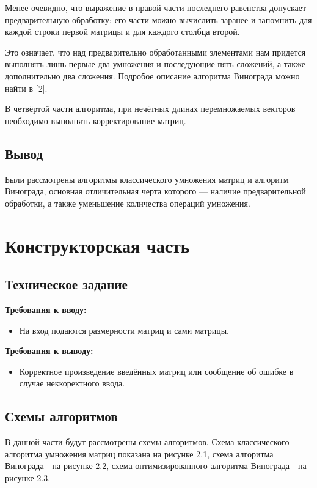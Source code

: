\documentclass[12pt]{report}
\begin{document}
Менее очевидно, что выражение в правой части последнего равенства допускает предварительную обработку: его части можно вычислить заранее и запомнить для каждой строки первой матрицы и для каждого столбца второй. 

Это означает, что над предварительно обработанными элементами нам придется выполнять лишь первые два умножения и последующие пять сложений, а также дополнительно два сложения. Подробое описание алгоритма Винограда можно найти в [2].

В четвёртой части алгоритма, при нечётных длинах перемножаемых векторов необходимо выполнять корректирование матриц.

\section{Вывод}
Были рассмотрены алгоритмы классического умножения матриц и алгоритм Винограда, основная отличительная черта которого — наличие предварительной обработки, а также уменьшение количества операций умножения.


\chapter{Конструкторская часть}
\section{Техническое задание}
\textbf{Требования к вводу:}\\
\begin{itemize}
	\item На вход подаются размерности матриц и сами матрицы.
\end{itemize}

\textbf{Требования к выводу:}\\
\begin{itemize}
	\item Корректное произведение введённых матриц или сообщение об ошибке в случае неккоректного ввода.
\end{itemize}


\section{Схемы алгоритмов}
В данной части будут рассмотрены схемы алгоритмов. Схема классического алгоритма умножения матриц показана на рисунке 2.1, схема алгоритма Винограда - на рисунке 2.2, схема оптимизированного алгоритма Винограда - на рисунке 2.3.
\end{document}

